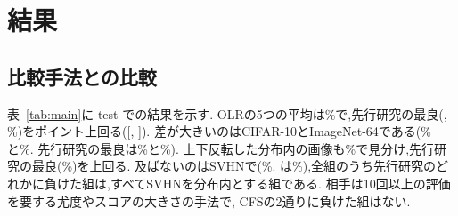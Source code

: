 \documentclass[MIRU,submit]{miru2025j}
\newcommand{\Ours}{OLR}   %
\begin{document}
\section{結果}
\label{sec:results}
\subsection{比較手法との比較}
\label{sec:prior}
表~\ref{tab:main}に test での結果を示す. \Ours{}の5つの平均は\olTestOL\%で,先行研究の最良(\olBestPriorName, \olBestPriorMean\%)を\olGapCfsKnn{}ポイント上回る([\olGapCfsKnnLo, \olGapCfsKnnHi]). 差が大きいのはCIFAR-10とImageNet-64である(\olTestCten\%と\olTestIN\%. 先行研究の最良は\olPriorBestCten\%と\olPriorBestIN\%). 上下反転した分布内の画像も\olTestVf\%で見分け,先行研究の最良(\olVfBestPriorAvg\%)を上回る. 及ばないのはSVHNで(\olTestSVHN\%. \olPriorBestSVHNName{}は\olPriorBestSVHN\%),全\olPairs{}組のうち先行研究のどれかに負けた\olNLostPrior{}組は,すべてSVHNを分布内とする組である. 相手は10回以上の評価を要する尤度やスコアの大きさの手法で, CFSの2通りに負けた組はない.
\end{document}
